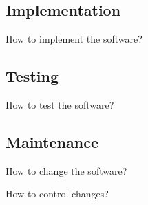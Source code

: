 \subsection{Implementation}
\begin{frame}[2]{How to implement the software?}
\end{frame}

\subsection{Testing}
\begin{frame}{How to test the software?}
	\slideMindmapQualityAssurance{}{}{}{}{}{}{}
\end{frame}

\subsection{Maintenance}
\begin{frame}[2]{How to change the software?}
	\slideEvolutionAndMaintenance
\end{frame}
\begin{frame}{How to control changes?}
	\centering{}
\end{frame}


%	
